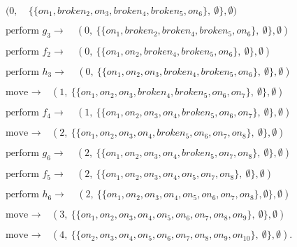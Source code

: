 \documentclass[a4paper,fleqn]{cas-dc}
\begin{document}
\scriptsize
\begin{align*}
\begin{split}
(0, & \ \{\{on_1, broken_2, on_3, broken_4, broken_5, on_6\},\ \emptyset\}, \emptyset)
\end{split}
\\\begin{split}
\text{perform } g_3 \to \ & (0, \ \{\{on_1, broken_2, broken_4, broken_5, on_6\},\ \emptyset\}, \emptyset)
\end{split}
\\\begin{split}
\text{perform } f_2 \to \ & (0, \ \{\{on_1, on_2, broken_4, broken_5, on_6\},\ \emptyset\}, \emptyset)
\end{split}
\\\begin{split}
\text{perform } h_3 \to \ & (0, \ \{\{on_1, on_2, on_3, broken_4, broken_5, on_6\},\  \emptyset\}, \emptyset)
\end{split}
\\\begin{split}
\text{move } \to \ & (1, \ \{\{on_1, on_2, on_3, broken_4, broken_5, on_6, on_7\}, \ \emptyset\}, \emptyset)
\end{split}
\\\begin{split}
\text{perform } f_4 \to \ & (1, \ \{\{on_1, on_2, on_3, on_4, broken_5, on_6, on_7\},\ \emptyset\}, \emptyset)
\end{split}
\\\begin{split}
\text{move } \to \ & (2, \ \{\{on_1, on_2, on_3, on_4, broken_5, on_6, on_7, on_8\},\ \emptyset\}, \emptyset)
\end{split}
\\\begin{split}
\text{perform } g_6 \to \ & (2, \ \{\{on_1, on_2, on_3, on_4, broken_5, on_7, on_8\}, \ \emptyset\}, \emptyset)
\end{split}
\\\begin{split}
\text{perform } f_5 \to \ & (2, \ \{\{on_1, on_2, on_3, on_4, on_5, on_7, on_8\},\ \emptyset\}, \emptyset)
\end{split}
\\\begin{split}
\text{perform } h_6 \to \ & (2, \ \{\{on_1, on_2, on_3, on_4, on_5, on_6, on_7, on_8\},\emptyset\}, \emptyset)
\end{split}
\\\begin{split}
\text{move } \to \ & (3, \ \{\{on_1, on_2, on_3, on_4, on_5, on_6, on_7, on_8, on_9\},\ \emptyset\}, \emptyset)
\end{split}
\\\begin{split}
\text{move } \to \ & (4, \ \{\{on_2, on_3, on_4, on_5, on_6, on_7, on_8, on_9, on_{10}\},\ \emptyset\}, \emptyset).
\end{split}
\end{align*}
\normalsize
\end{document}
